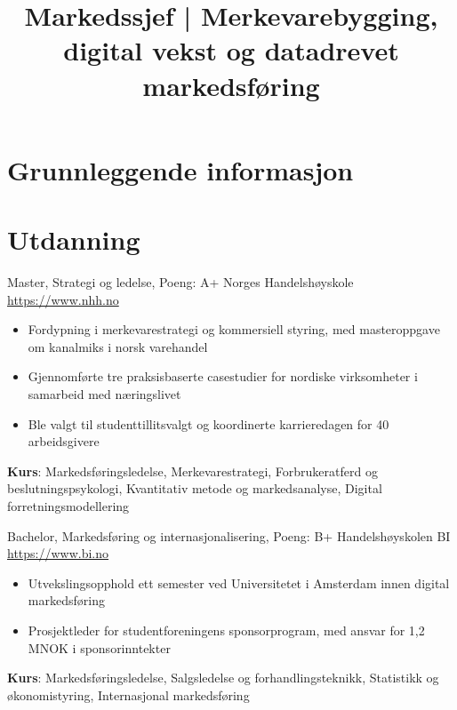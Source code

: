 \documentclass[a4paper, serif, 10pt]{moderncv}
\title{Markedssjef | Merkevarebygging, digital vekst og datadrevet markedsføring}
\begin{document}
\maketitle

\section{Grunnleggende informasjon}

\section{Utdanning}

        {Master, Strategi og ledelse, Poeng: A+}
        {Norges Handelshøyskole}
        {\url{https://www.nhh.no}}
        {}
        {\begin{itemize}
\item Fordypning i merkevarestrategi og kommersiell styring, med masteroppgave om kanalmiks i norsk varehandel
\item Gjennomførte tre praksisbaserte casestudier for nordiske virksomheter i samarbeid med næringslivet
\item Ble valgt til studenttillitsvalgt og koordinerte karrieredagen for 40 arbeidsgivere
\end{itemize}
\textbf{Kurs}: Markedsføringsledelse, Merkevarestrategi, Forbrukeratferd og beslutningspsykologi, Kvantitativ metode og markedsanalyse, Digital forretningsmodellering}

        {Bachelor, Markedsføring og internasjonalisering, Poeng: B+}
        {Handelshøyskolen BI}
        {\url{https://www.bi.no}}
        {}
        {\begin{itemize}
\item Utvekslingsopphold ett semester ved Universitetet i Amsterdam innen digital markedsføring
\item Prosjektleder for studentforeningens sponsorprogram, med ansvar for 1,2 MNOK i sponsorinntekter
\end{itemize}
\textbf{Kurs}: Markedsføringsledelse, Salgsledelse og forhandlingsteknikk, Statistikk og økonomistyring, Internasjonal markedsføring}
\end{document}
